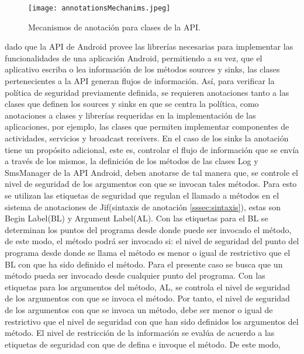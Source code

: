 \begin{figure}[t!]
	\begin{center}
	\texttt{[image: annotationsMechanims.jpeg]}
	\end{center}
	\caption{Mecanismos de anotación para clases de la API.}
	\label{fig:annotationsMechanims}  
\end{figure}
dado que la API de Android provee las librerías necesarias para implementar las
funcionalidades de una aplicación Android, permitiendo a su vez, que el
aplicativo escriba o lea información de los métodos sources y sinks, las clases
pertenecientes a la API generan flujos de información. Así, para verificar la
política de seguridad previamente definida, se requieren anotaciones tanto a las
clases que definen los sources y sinks en que se centra la política, como
anotaciones a clases y librerías requeridas en la implementación de las
aplicaciones, por ejemplo, las clases que permiten implementar componentes
de actividades, servicios y broadcast receivers.\newline 
En el caso de los sinks la anotación tiene un propósito adicional, este es,
controlar el flujo de información que se envía a través de los mismos, la
definición de los métodos de las clases Log y SmsManager de la API Android,
deben anotarse de tal manera que, se controle el nivel de seguridad de los
argumentos con que se invocan tales métodos.\newline 
Para esto se utilizan las etiquetas de seguridad que regulan el llamado a
métodos en el sistema de anotaciones de Jif(sintaxis de anotación
\ref{sssec:sintaxis}), estas son Begin Label(BL) y Argument Label(AL).
Con las etiquetas para el BL se determinan los puntos del programa desde donde
puede ser invocado el método, de este modo, el método podrá ser invocado si: el
nivel de seguridad del punto del programa desde donde se llama el método es
menor o igual de restrictivo que el BL con que ha sido definido el método. Para
el presente caso se busca que un método pueda ser invocado desde cualquier punto
del programa.\newline
Con las etiquetas para los argumentos del método, AL, se controla el nivel de
seguridad de los argumentos con que se invoca el método. Por tanto, el nivel de
seguridad de los argumentos con que se invoca un método, debe ser menor o igual
de restrictivo que el nivel de seguridad con que han sido definidos los
argumentos del método.\newline
El nivel de restricción de la información se evalúa de acuerdo a las
etiquetas de seguridad con que de defina e invoque el método. De este modo,
